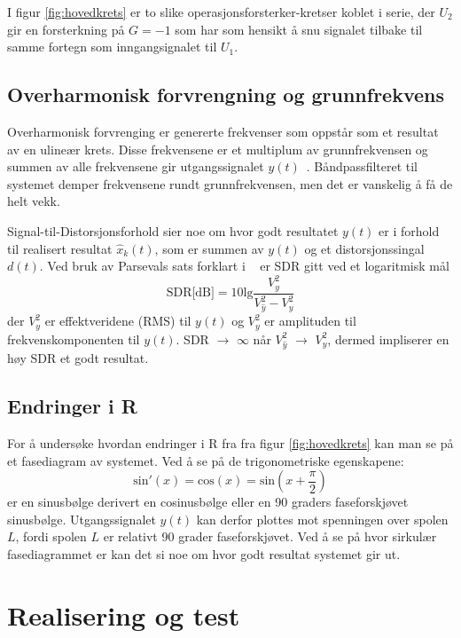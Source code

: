\documentclass[a4paper,11pt,norsk]{article}
\begin{document}
I figur \ref{fig:hovedkrets} er to slike operasjonsforsterker-kretser koblet i serie, der $U
_2$ gir en forsterkning på $G = -1$ som har som hensikt å snu signalet tilbake til samme fortegn som inngangsignalet til $U_1$. 

\subsection{Overharmonisk forvrengning og grunnfrekvens}
\label{sub:overharmonisk}

Overharmonisk forvrenging er genererte frekvenser som oppstår som et resultat av en ulineær krets. Disse frekvensene er et multiplum av grunnfrekvensen og summen av alle frekvensene gir utgangssignalet $y(t)$~\cite{D3}. Båndpassfilteret til systemet demper frekvensene rundt grunnfrekvensen, men det er vanskelig å få de helt vekk. 

Signal-til-Distorsjonsforhold sier noe om hvor godt resultatet $y(t)$ er i forhold til realisert resultat $\hat{x}_k(t)$, som er summen av $y(t)$ og et distorsjonssingal $d(t)$. Ved bruk av Parsevals sats forklart i ~\cite[Eit kvalitetsmål, s. 3-4)]{notat} er SDR gitt ved et logaritmisk mål 
\begin{equation}
    \text{SDR[dB]} = 10\text{lg}\frac{V^2_{y}}{V^2_{\hat{y}}-V^2_{y}}
    \label{eq:SDR}
\end{equation}
der $V^2_{y}$ er effektveridene (RMS) til $y(t)$ og $V^2_y$ er amplituden til frekvenskomponenten til $y(t)$. SDR $\xrightarrow{}$ $\infty$ når $V^2_{\hat{y}}$ $\xrightarrow{}$ $V^2_{y}$, dermed impliserer en høy SDR et godt resultat. 
\subsection{Endringer i R}
For å undersøke hvordan endringer i R fra fra figur \ref{fig:hovedkrets} kan man se på et fasediagram av systemet. Ved å se på de trigonometriske egenskapene:
\begin{equation}
    \text{sin}'(x) = \text{cos}(x) =  \text{sin}(x + \frac{\pi}{2})
\end{equation}
er en sinusbølge derivert en cosinusbølge eller en 90 graders faseforskjøvet sinusbølge. Utgangssignalet $y(t)$ kan derfor plottes mot spenningen over spolen $L$, fordi spolen $L$ er relativt 90 grader faseforskjøvet. Ved å se på hvor sirkulær fasediagrammet er kan det si noe om hvor godt resultat systemet gir ut. 

\section{Realisering og test}
\label{sec:realisering}
\end{document}
